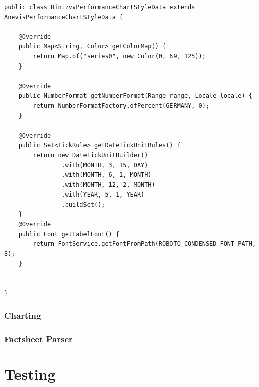 \begin{lstlisting}[caption={method}]
public class HintzvvPerformanceChartStyleData extends AnevisPerformanceChartStyleData {

	@Override
	public Map<String, Color> getColorMap() {
		return Map.of("series0", new Color(0, 69, 125));
	}

	@Override
	public NumberFormat getNumberFormat(Range range, Locale locale) {
		return NumberFormatFactory.ofPercent(GERMANY, 0);
	}

	@Override
	public Set<TickRule> getDateTickUnitRules() {
		return new DateTickUnitBuilder()
				.with(MONTH, 3, 15, DAY)
				.with(MONTH, 6, 1, MONTH)
				.with(MONTH, 12, 2, MONTH)
				.with(YEAR, 5, 1, YEAR)
				.buildSet();
	}
	@Override
	public Font getLabelFont() {
		return FontService.getFontFromPath(ROBOTO_CONDENSED_FONT_PATH, 8);
	}


}
\end{lstlisting}

\subsubsection{Charting}

\subsubsection{Factsheet Parser}

\section{Testing}
